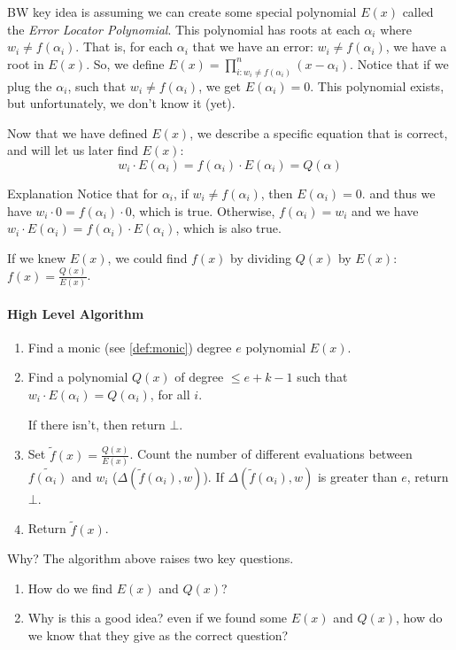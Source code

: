 BW key idea is assuming we can create some special polynomial $E(x)$ called
the \emph{Error Locator Polynomial}. 
This polynomial has roots at each $\alpha_i$ where $w_i\ne f(\alpha_i)$. That is, 
for each $\alpha_i$  that we have an error: $w_i\ne f(\alpha_i)$, we have a root in $E(x)$.
So, we define $ E(x) = \prod_{i:w_i\ne f(\alpha_i)}^{n} (x-\alpha_i)$.
Notice that if we plug the $\alpha_i$, such that $w_i\ne f(\alpha_i)$,
 we get $E(\alpha_i)=0$.
This polynomial exists, but unfortunately, we don't know it (yet). 

Now that we have defined $E(x)$, we describe a specific 
equation that is correct, and will let us later find $E(x)$:
$$ w_i\cdot E(\alpha_i) = f(\alpha_i)\cdot E(\alpha_i)= Q(\alpha)$$


\begin{bclogo}[logo=\bcinfo,noborder=true]{Explanation}
    Notice that for $\alpha_i$, if $w_i\ne f(\alpha_i)$, then $E(\alpha_i)=0$.
    and thus we have $w_i\cdot 0 = f(\alpha_i)\cdot 0$, which is true.
    Otherwise, $f(\alpha_i)=w_i$ and we have
     $w_i\cdot E(\alpha_i) = f(\alpha_i)\cdot E(\alpha_i)$, which is also true.
\end{bclogo}

If we knew $E(x)$, we could find $f(x)$ by dividing $Q(x)$ by $E(x)$:
$f(x)=\frac{Q(x)}{E(x)}$.

\paragraph{High Level Algorithm}
\begin{enumerate}
    \item Find a monic (see \autoref{def:monic}) degree $e$ polynomial $E(x)$.
    \item Find a polynomial $Q(x)$ of degree $\le e+k-1$ such 
    that $w_i\cdot E(\alpha_i)=Q(\alpha_i)$, for all $i$.

    If there isn't, then return $\bot$.
    \item Set $\tilde{f}(x)=\frac{Q(x)}{E(x)}$. Count the number of different 
    evaluations between $\tilde{f(\alpha_i)}$ and $w_i$ ($\Delta(\tilde{f}(\alpha_i),w)$).  
    If  $\Delta(\tilde{f}(\alpha_i),w)$ is greater than $e$, return $\bot$.
    \item Return $\tilde{f}(x)$.
\end{enumerate}


\begin{bclogo}[logo=\bcquestion]{Why?}
    The algorithm above raises two key questions.
    \begin{enumerate}
        \item How do we find $E(x)$ and $Q(x)$?
        \item Why is this a good idea? even if we found some $E(x)$ and $Q(x)$, 
        how do we know that they give as the correct question?
    \end{enumerate}    
\end{bclogo}


